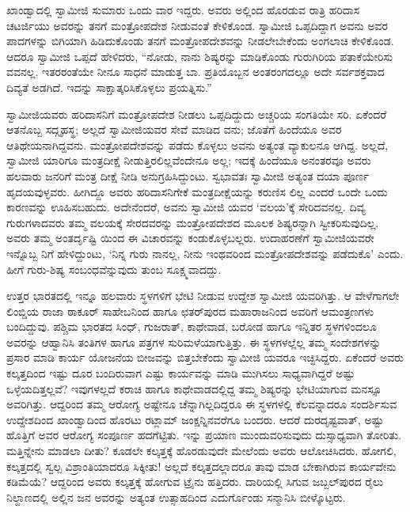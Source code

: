 ಖಾಂಡ್ವಾದಲ್ಲಿ ಸ್ವಾಮೀಜಿ ಸುಮಾರು ಒಂದು ವಾರ ಇದ್ದರು. ಅವರು ಅಲ್ಲಿಂದ ಹೊರಡುವ ರಾತ್ರಿ ಹರಿದಾಸ ಚಟರ್ಜಿಯು ಅವರನ್ನು ತನಗೆ ಮಂತ್ರೋಪದೇಶ ನೀಡುವಂತೆ ಕೇಳಿಕೊಂಡ. ಸ್ವಾಮೀಜಿ ಒಪ್ಪದಿದ್ದಾಗ ಅವನು ಅವರ ಪಾದಗಳನ್ನು ಬಿಗಿಯಾಗಿ ಹಿಡಿದುಕೊಂಡು ತನಗೆ ಮಂತ್ರೋಪದೇಶವನ್ನು ನೀಡಲೇಬೇಕೆಂದು ಅಂಗಲಾಚಿ ಕೇಳಿಕೊಂಡ. ಆದರೂ ಸ್ವಾಮೀಜಿ ಒಪ್ಪದೆ ಹೇಳಿದರು, “ನೋಡು, ನಾನು ಶಿಷ್ಯರನ್ನು ಮಾಡಿಕೊಂಡು ಗುರುಗಿರಿಯ ಪತಾಕೆಯೇರಿಸು ವವನಲ್ಲ. ಇತರರಂತೆಯೇ ನೀನೂ ಸಾಧನೆ ಮಾಡುತ್ತ ಬಾ. ಪ್ರತಿಯೊಬ್ಬನ ಅಂತರಂಗದಲ್ಲೂ ಅದೇ ಸರ್ವಶಕ್ತವಾದ ದಿವ್ಯತೆ ಅಡಗಿದೆ. ಇದನ್ನು ಸಾಕ್ಷಾತ್ಕರಿಸಿಕೊಳ್ಳಲು ಪ್ರಯತ್ನಿಸು.”

ಸ್ವಾಮೀಜಿಯವರು ಹರಿದಾಸನಿಗೆ ಮಂತ್ರೋಪದೇಶ ನೀಡಲು ಒಪ್ಪದಿದ್ದುದು ಅಚ್ಚರಿಯ ಸಂಗತಿಯೇ ಸರಿ. ಏಕೆಂದರೆ ಆತನೊಬ್ಬ ಸದ್ಗೃಹಸ್ಥ; ಅಲ್ಲದೆ ಸ್ವಾಮೀಜಿಯವರ ಸೇವೆ ಮಾಡಿದ ವನು; ಜೊತೆಗೆ ಹಿಂದೆಯೂ ಅವರ ಆತಿಥೇಯನಾಗಿದ್ದವನು. ಮಂತ್ರೋಪದೇಶವನ್ನು ಪಡೆದು ಕೊಳ್ಳಲು ಅವನು ಅತ್ಯಂತ ವ್ಯಾಕುಲನೂ ಆಗಿದ್ದ. ಅಲ್ಲದೆ, ಸ್ವಾಮೀಜಿ ಯಾರಿಗೂ ಮಂತ್ರದೀಕ್ಷೆ ನೀಡುತ್ತಿರಲಿಲ್ಲವೆಂದೇನೂ ಅಲ್ಲ; ಇದಕ್ಕೆ ಹಿಂದೆಯೂ ಅನಂತರವೂ ಅವರು ಹಲವಾರು ಜನರಿಗೆ ಮಂತ್ರ ದೀಕ್ಷೆ ನೀಡಿ ಅನುಗ್ರಹಿಸಿದ್ದುಂಟು. ಸ್ವಭಾವತಃ ಸ್ವಾಮೀಜಿ ಅತ್ಯಂತ ದಯಾ ಪೂರ್ಣ ಹೃದಯವುಳ್ಳವರು. ಹೀಗಿದ್ದೂ ಅವರು ಹರಿದಾಸನಿಗೇಕೆ ಮಂತ್ರದೀಕ್ಷೆಯನ್ನು ಕರುಣಿಸ ಲಿಲ್ಲ ಎಂದರೆ ಒಂದೇ ಒಂದು ಕಾರಣವನ್ನು ಊಹಿಸಬಹುದು. ಅದೇನೆಂದರೆ, ಅವನು ಸ್ವಾಮೀಜಿ ಯವರ ‘ವಲಯ’ಕ್ಕೆ ಸೇರಿದವನಲ್ಲ. ದಿವ್ಯ ಗುರುಗಳಾದವರು ತಮ್ಮ ವಲಯಕ್ಕೆ ಸೇರದವರನ್ನು ಮಂತ್ರೋಪದೇಶದ ಮೂಲಕ ಶಿಷ್ಯರನ್ನಾಗಿ ಸ್ವೀಕರಿಸುವುದಿಲ್ಲ. ಅವರು ತಮ್ಮ ಅಂತರ್ದೃಷ್ಟಿ ಯಿಂದ ಈ ವಿಚಾರವನ್ನು ಕಂಡುಕೊಳ್ಳಬಲ್ಲರು. ಉದಾಹರಣೆಗೆ ಸ್ವಾಮೀಜಿಯವರೇ ಇನ್ನೊಬ್ಬ ನಿಗೆ ಹೇಳಿದ್ದುಂಟು, ‘ನಿನ್ನ ಗುರು ನಾನಲ್ಲ, ನೀನು ಇಂಥವರಿಂದ ಮಂತ್ರೋಪದೇಶವನ್ನು ಪಡೆದುಕೊ’ ಎಂದು. ಹೀಗೆ ಗುರು-ಶಿಷ್ಯ ಸಂಬಂಧವೆನ್ನುವುದು ತುಂಬ ಸೂಕ್ಷ್ಮವಾದದ್ದು.

ಉತ್ತರ ಭಾರತದಲ್ಲಿ ಇನ್ನೂ ಹಲವಾರು ಸ್ಥಳಗಳಿಗೆ ಭೇಟಿ ನೀಡುವ ಉದ್ದೇಶ ಸ್ವಾಮೀಜಿ ಯವರಿಗಿತ್ತು. ಆ ವೇಳೆಗಾಗಲೇ ಲಿಂಬ್ಡಿಯ ರಾಜಾ ಠಾಕೂರ್ ಸಾಹೇಬನಿಂದ ಹಾಗೂ ಛತರ್​ಪುರದ ಮಹಾರಾಜನಿಂದ ಅವರಿಗೆ ಆಮಂತ್ರಣಗಳು ಬಂದಿದ್ದುವು. ಪಶ್ಚಿಮ ಭಾರತದ ಸಿಂಧ್, ಗುಜರಾತ್, ಕಾಥೇವಾಡ, ಬರೋಡ ಹಾಗೂ ಇನ್ನಿತರ ಸ್ಥಳಗಳಿಂದಲೂ ಅವರನ್ನು ಆಹ್ವಾನಿಸಿ ತಂತಿಗಳ ಹಾಗೂ ಪತ್ರಗಳ ಸುರಿಮಳೆಯಾಗುತ್ತಿತ್ತು. ಈ ಸ್ಥಳಗಳಲ್ಲೆಲ್ಲ ತಮ್ಮ ಸಂದೇಶಗಳನ್ನು ಪ್ರಸಾರ ಮಾಡಿ ಕಾರ್ಯ ಯೋಜನೆಯ ಬೀಜವನ್ನು ಬಿತ್ತಬೇಕೆಂದು ಸ್ವಾಮೀಜಿ ಯವರೂ ಇಚ್ಛಿಸಿದ್ದರು. ಏಕೆಂದರೆ ಅವರು ಕಲ್ಕತ್ತದಿಂದ ಇಷ್ಟು ದೂರ ಬಂದಿರುವಾಗ ಎಷ್ಟು ಕಾರ್ಯವನ್ನು ಮಾಡಿ ಮುಗಿಸಲು ಸಾಧ್ಯವಾಗಿದ್ದರೆ ಅಷ್ಟು ಒಳ್ಳೆಯದಿತ್ತಲ್ಲವೆ? ಇವುಗಳಲ್ಲದೆ ಕರಾಚಿ ಹಾಗೂ ಕಾಥೇವಾಡದಲ್ಲಿದ್ದ ತಮ್ಮ ಶಿಷ್ಯರನ್ನು ಭೇಟಿಯಾಗುವ ಮನಸ್ಸೂ ಅವರಿಗಿತ್ತು. ಆದ್ದರಿಂದ ತಮ್ಮ ಆರೋಗ್ಯ ಅಷ್ಟೇನೂ ಚೆನ್ನಾಗಿಲ್ಲದಿದ್ದರೂ ಈ ಸ್ಥಳಗಳಲ್ಲಿ ಕೆಲವನ್ನಾದರೂ ಸಂದರ್ಶಿಸುವ ಉದ್ದೇಶದಿಂದ ಖಾಂಡ್ವಾದಿಂದ ಹೊರಟು ರಟ್ಲಾಮ್ ಜಂಕ್ಷನ್ನಿನವರೆಗೂ ಬಂದರು. ಆದರೆ ದುರದೃಷ್ಟವಾತ್, ಅಷ್ಟು ಹೊತ್ತಿಗೆ ಅವರ ಆರೋಗ್ಯ ಸಂಪೂರ್ಣ ಹದಗೆಟ್ಟಿತು. ಇನ್ನು ಪ್ರಯಾಣ ಮುಂದುವರಿಸುವುದು ದುಸ್ಸಾಧ್ಯವಾಗಿ ತೋರಿತು. ಮತ್ತಿನ್ನೇನು ಮಾಡಲಾ ದೀತು? ಕೂಡಲೇ ಕಲ್ಕತ್ತಕ್ಕೆ ಹೊರಡುವುದೇ ಮೇಲೆಂದು ಅವರು ಆಲೋಚಿಸಿದರು. ಹೋಗಲಿ, ಕಲ್ಕತ್ತದಲ್ಲಿ ಸ್ವಲ್ಪ ವಿಶ್ರಾಂತಿಯಾದರೂ ಸಿಕ್ಕೀತು! ಅಲ್ಲದೆ ಕಲ್ಕತ್ತದಲ್ಲಾದರೂ ತಾವು ಮಾಡ ಬೇಕಾಗಿರುವ ಕಾರ್ಯವೇನು ಕಡಿಮೆಯೆ? ಆದ್ದರಿಂದ ಅವರು ಕಲ್ಕತ್ತಕ್ಕೆ ಹೋಗುವ ಟ್ರೈನು ಹತ್ತಿದರು. ದಾರಿಯಲ್ಲಿ ಸಿಗುವ ಜಬ್ಬಲ್​ಪುರದ ರೈಲು ನಿಲ್ದಾಣದಲ್ಲಿ ಅಲ್ಲಿನ ಜನ ಅವರನ್ನು ಅತ್ಯಂತ ಉತ್ಸಾಹದಿಂದ ಎದುರ್ಗೊಂಡು ಸನ್ಮಾನಿಸಿ ಬೀಳ್ಕೊಟ್ಟರು.

